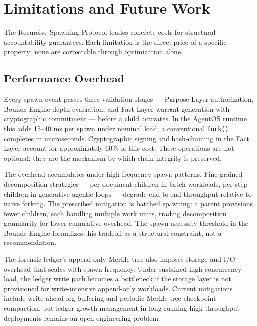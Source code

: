 \section{Limitations and Future Work}
\label{sec:rs-limitations}

The Recursive Spawning Protocol trades concrete costs for structural accountability guarantees. Each limitation is the direct price of a specific property; none are correctable through optimization alone.

\subsection{Performance Overhead}
\label{sec:rs-perf-overhead}

Every spawn event passes three validation stages — Purpose Layer authorization, Bounds Engine depth evaluation, and Fact Layer warrant generation with cryptographic commitment — before a child activates. In the AgentOS runtime this adds \numrange{15}{40} ms per spawn under nominal load; a conventional \texttt{fork()} completes in microseconds. Cryptographic signing and hash-chaining in the Fact Layer account for approximately 60\% of this cost. These operations are not optional; they are the mechanism by which chain integrity is preserved.

The overhead accumulates under high-frequency spawn patterns. Fine-grained decomposition strategies — per-document children in batch workloads, per-step children in generative agentic loops — degrade end-to-end throughput relative to naive forking. The prescribed mitigation is batched spawning: a parent provisions fewer children, each handling multiple work units, trading decomposition granularity for lower cumulative overhead. The spawn necessity threshold in the Bounds Engine formalizes this tradeoff as a structural constraint, not a recommendation.

The forensic ledger's append-only Merkle-tree also imposes storage and I/O overhead that scales with spawn frequency. Under sustained high-concurrency load, the ledger write path becomes a bottleneck if the storage layer is not provisioned for write-intensive append-only workloads. Current mitigations include write-ahead log buffering and periodic Merkle-tree checkpoint compaction, but ledger growth management in long-running high-throughput deployments remains an open engineering problem.

